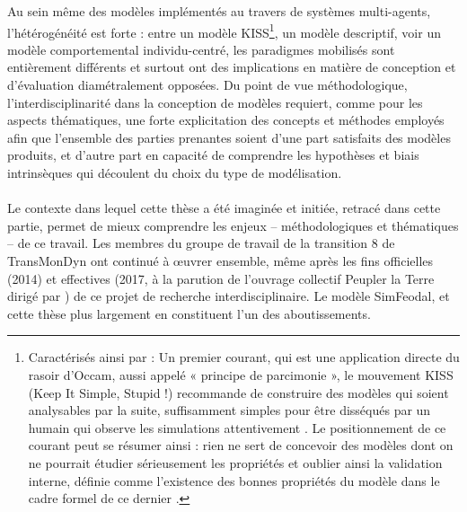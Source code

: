 Au sein même des modèles implémentés au travers de systèmes multi-agents, l'hétérogénéité est forte : entre un modèle KISS\footnote{
Caractérisés ainsi par \textcite[110]{amblard_evaluation_2006} : 
\og Un premier courant, qui est une application directe du rasoir d'Occam, aussi appelé « principe de parcimonie », le mouvement KISS (Keep It Simple, Stupid !) recommande de construire des modèles qui soient analysables par la suite, suffisamment simples pour être disséqués par un humain qui observe les simulations attentivement \textelp{}.
Le positionnement de ce courant peut se résumer ainsi : rien ne sert de concevoir des modèles dont on ne pourrait étudier sérieusement les propriétés et oublier ainsi la validation interne, définie comme l'existence des bonnes propriétés du modèle dans le cadre formel de ce dernier
\fg{}.
}, un modèle descriptif, voir un modèle comportemental individu-centré, les paradigmes mobilisés sont entièrement différents et surtout ont des implications en matière de conception et d'évaluation diamétralement opposées.
Du point de vue méthodologique, l'interdisciplinarité dans la conception de modèles requiert, comme pour les aspects thématiques, une forte explicitation des concepts et méthodes employés afin que l'ensemble des parties prenantes soient d'une part satisfaits des modèles produits, et d'autre part en capacité de comprendre les hypothèses et biais intrinsèques qui découlent du choix du type de modélisation.

\bigskip
\paragraph[Conclusion intermédiaire]{}
Le contexte dans lequel cette thèse a été imaginée et initiée, retracé dans cette partie, permet de mieux comprendre les enjeux -- méthodologiques et thématiques -- de ce travail.
Les membres du groupe de travail de la \og transition 8\fg{} de TransMonDyn ont continué à œuvrer ensemble, même après les fins officielles (2014) et effectives (2017, à la parution de l'ouvrage collectif \og Peupler la Terre\fg{} dirigé par \textcite{sanders2018peupler}) de ce projet de recherche interdisciplinaire.
Le modèle SimFeodal, et cette thèse plus largement en constituent l'un des aboutissements.

